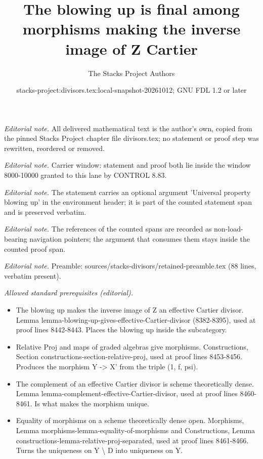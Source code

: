 \documentclass[10pt,a4paper]{amsart}
\title{The blowing up is final among morphisms making the inverse image of Z Cartier}
\author{The Stacks Project Authors}
\date{stacks-project:divisors.tex:local-snapshot-20261012; GNU FDL 1.2 or later}
\theoremstyle{plain}
\theoremstyle{definition}
\theoremstyle{remark}
\numberwithin{equation}{subsection}
\begin{document}
\maketitle
\setcounter{subsection}{1}
\noindent\textit{Editorial note.} All delivered mathematical text is the author's own, copied from the pinned Stacks Project chapter file divisors.tex; no statement or proof step was rewritten, reordered or removed.\par\medskip
\noindent\textit{Editorial note.} Carrier window: statement and proof both lie inside the window 8000-10000 granted to this lane by CONTROL 8.83.\par\medskip
\noindent\textit{Editorial note.} The statement carries an optional argument 'Universal property blowing up' in the environment header; it is part of the counted statement span and is preserved verbatim.\par\medskip
\noindent\textit{Editorial note.} The references of the counted spans are recorded as non-load-bearing navigation pointers; the argument that consumes them stays inside the counted proof span.\par\medskip
\noindent\textit{Editorial note.} Preamble: sources/stacks-divisors/retained-preamble.tex (88 lines, verbatim present).\par\medskip
\noindent\textit{Allowed standard prerequisites (editorial).}\begin{itemize}
\item The blowing up makes the inverse image of Z an effective Cartier divisor. Lemma lemma-blowing-up-gives-effective-Cartier-divisor (8382-8395), used at proof lines 8442-8443. Places the blowing up inside the subcategory.
\item Relative Proj and maps of graded algebras give morphisms. Constructions, Section constructions-section-relative-proj, used at proof lines 8453-8456. Produces the morphism Y -> X' from the triple (1, f, psi).
\item The complement of an effective Cartier divisor is scheme theoretically dense. Lemma lemma-complement-effective-Cartier-divisor, used at proof lines 8460-8461. Is what makes the morphism unique.
\item Equality of morphisms on a scheme theoretically dense open. Morphisms, Lemma morphisms-lemma-equality-of-morphisms and Constructions, Lemma constructions-lemma-relative-proj-separated, used at proof lines 8461-8466. Turns the uniqueness on Y \textbackslash{} D into uniqueness on Y.
\end{itemize}\medskip
\end{document}

